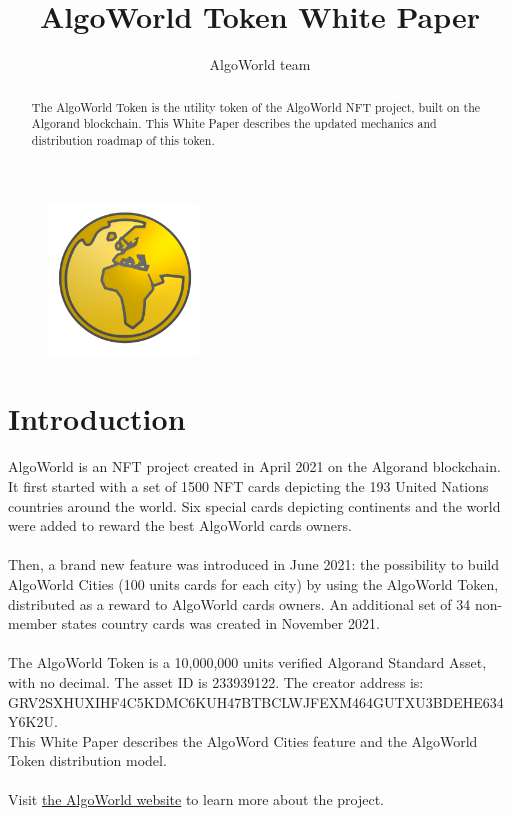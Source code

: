\documentclass{article}
\title{AlgoWorld Token White Paper}
\author{AlgoWorld team}
\begin{document}
\maketitle

\begin{figure}[htp]
    \centering
    \includegraphics[width=4cm]{awt_logo.png}
\end{figure}

\begin{abstract}
The AlgoWorld Token is the utility token of the AlgoWorld NFT project, built on the Algorand blockchain. This White Paper describes the updated mechanics and distribution roadmap of this token. 

\end{abstract}

\section{Introduction}

AlgoWorld is an NFT project created in April 2021 on the Algorand blockchain. It first started with a set of 1500 NFT cards depicting the 193 United Nations countries around the world. Six special cards depicting continents and the world were added to reward the best AlgoWorld cards owners.
\\
\\
Then, a brand new feature was introduced in June 2021: the possibility to build AlgoWorld Cities (100 units cards for each city) by using the AlgoWorld Token, distributed as a reward to AlgoWorld cards owners. An additional set of 34 non-member states country cards was created in November 2021.
\\
\\
The AlgoWorld Token is a 10,000,000 units verified Algorand Standard Asset, with no decimal. The asset ID is 233939122.
The creator address is:
\\
GRV2SXHUXIHF4C5KDMC6KUH47BTBCLWJFEXM464GUTXU3BDEHE634Y6K2U.
\\
This White Paper describes the AlgoWord Cities feature and the AlgoWorld Token distribution model. 
\\
\\
Visit \href{https://www.algoworld.io}{the AlgoWorld website} to learn more about the project.
\end{document}
